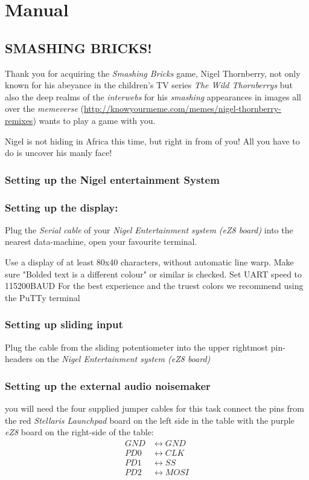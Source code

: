 \section{Manual}

\subsection{SMASHING BRICKS!}
Thank you for acquiring the \emph{Smashing Bricks} game,
Nigel Thornberry, not only known for his abeyance in the children's TV series
\emph{The Wild Thornberrys} but also the deep realms of the \emph{interwebs} for
his \emph{smashing} appearances in images all over the \emph{memeverse}
(\url{http://knowyourmeme.com/memes/nigel-thornberry-remixes}) wants to play a game with you.

Nigel is not hiding in Africa this time, but right in from of you! All you have
to do is uncover his manly face!

\subsubsection{Setting up the Nigel entertainment System}

\subsubsection{Setting up the display:}
Plug the \emph{Serial cable} of your \emph{Nigel Entertainment system (eZ8
board)} into the nearest data-machine, open your favourite terminal.

Use a display of at least 80x40 characters, without automatic line warp.
Make sure "Bolded text is a different colour" or similar is checked.
Set UART speed to 115200BAUD
For the best experience and the truest colors we recommend using the PuTTy terminal

\subsubsection{Setting up sliding input}
Plug the cable from the sliding potentiometer into the upper rightmost
pin-headers on the \emph{Nigel Entertainment system (eZ8
board)}

\subsubsection{Setting up the external audio noisemaker}
you will need the four supplied jumper cables for this task connect the pins
from the red \emph{Stellaris Launchpad} board on the left side in the table
with the purple \emph{eZ8} board on the right-side of the table:
\begin{align*}
GND &\leftrightarrow GND\\
PD0 &\leftrightarrow CLK\\
PD1 &\leftrightarrow SS\\
PD2 &\leftrightarrow MOSI
\end{align*}

